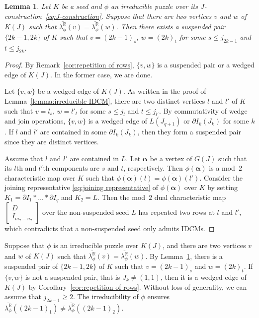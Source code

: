 \documentclass[11pt]{amsart}
\theoremstyle{plain}
\newtheorem{lemma}[theorem]{Lemma}
\numberwithin{equation}{section}
\theoremstyle{definition}
\newcommand{\R}{\mathbb{R}}
\begin{document}
\begin{lemma} \label{lemma:non-injectivity}
    Let $K$ be a seed and $\phi$ an irreducible puzzle over its $J$-construction~\eqref{eq:J-construction}.
    Suppose that there are two vertices $v$ and $w$ of $K(J)$ such that $\overline{\lambda_\phi^\R}(v) = \overline{\lambda_\phi^\R}(w)$.
    Then there exists a suspended pair $\{2k-1, 2k\}$ of $K$ such that $v = (2k-1)_{s}$, $w = (2k)_{t}$ for some $s \leq j_{2k-1}$ and $t \leq j_{2k}$.
\end{lemma}
    
\begin{proof}
    By Remark~\ref{cor:repetition of rows}, $\{v, w\}$ is a suspended pair or a wedged edge of $K(J)$.
    In the former case, we are done.
    
    Let $\{v, w\}$ be a wedged edge of $K(J)$.
    As written in the proof of Lemma~\ref{lemma:irreducible IDCM}, there are two distinct vertices $l$ and $l'$ of $K$ such that $v = l_{s}$, $w = l'_{t}$ for some $s \leq j_l$ and $t \leq j_{l'}$.
    By commutativity of wedge and join operations, $\{v, w\}$ is a wedged edge of $L(J_{q+1})$ or $\partial I_k (J_k)$ for some $k$.
    If $l$ and $l'$ are contained in some $\partial I_k (J_k)$, then they form a suspended pair since they are distinct vertices.
    
    Assume that $l$ and $l'$ are contained in $L$.
    Let $\bm{\alpha}$ be a vertex of $G(J)$ such that its $l$th and $l'$th components are $s$ and $t$, respectively.
    Then $\phi(\bm{\alpha})$ is a mod~$2$ characteristic map over $K$ such that $\overline{\phi(\bm{\alpha})}(l) = \overline{\phi(\bm{\alpha})}(l')$.
    Consider the joining representative \eqref{eq:joining representative} of $\phi(\bm{\alpha})$ over $K$ by setting $K_1 = \partial I_1 \ast \dots \ast \partial I_q$ and $K_2 = L$.
    Then the mod~$2$ dual characteristic map $\begin{bmatrix}
                 D \\
                 I_{m_2-n_2} 
               \end{bmatrix}$ over the non-suspended seed $L$ has repeated two rows at $l$ and $l'$, which contradicts that a non-suspended seed only admits IDCMs.
\end{proof}

Suppose that $\phi$ is an irreducible puzzle over $K(J)$, and there are two vertices $v$ and $w$ of $K(J)$ such that $\overline{\lambda^\R_\phi}(v) = \overline{\lambda^\R_\phi}(w)$.
By Lemma~\ref{lemma:non-injectivity}, there is a suspended pair of $\{2k-1, 2k\}$ of $K$ such that $v=(2k-1)_s$ and $w=(2k)_t$.
If $\{v, w\}$ is not a suspended pair, that is $J_k \not=(1,1)$, then it is a wedged edge of $K(J)$ by Corollary~\ref{cor:repetition of rows}.
Without loss of generality, we can assume that $j_{2k-1} \geq 2$.
The irreducibility of $\phi$ ensures $\overline{\lambda^\R_\phi}((2k-1)_1) \not= \overline{\lambda^\R_\phi}((2k-1)_2)$.
\end{document}
